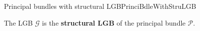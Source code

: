 \documentclass[reqno,a4paper,oneside]{amsart}
\theoremstyle{plain}
\theoremstyle{remark}
\theoremstyle{definition}
\def\bas#1\eas{\begin{align*}#1\end{align*}}
\begin{document}
\begin{definitions}{Principal bundles with structural LGB}{PrinciBdleWithStruLGB}
\begin{enumerate}
\end{enumerate}

The LGB $\mathcal{G}$ is the \textbf{structural LGB} of the principal bundle $\mathcal{P}$.
\end{definitions}
\end{document}
